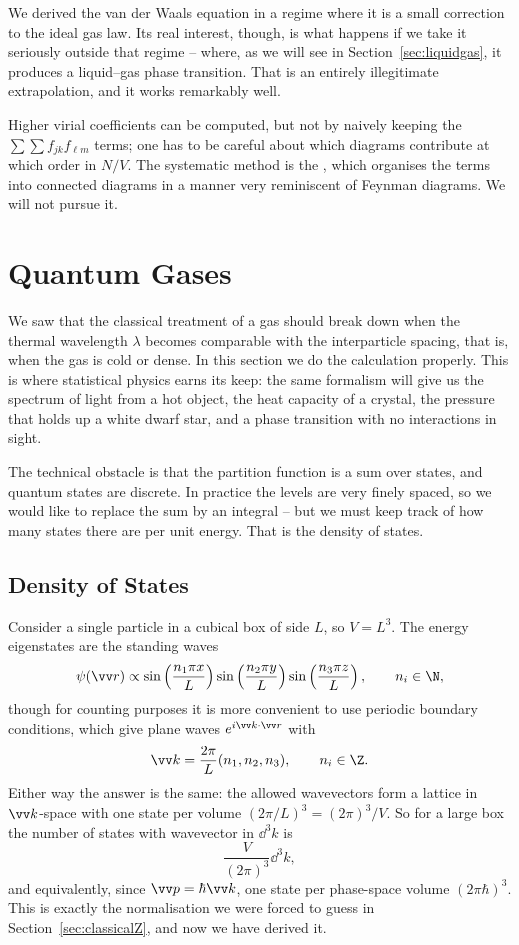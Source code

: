 We derived the van der Waals equation in a regime where it is a small correction to the ideal gas law. Its real interest, though, is what happens if we take it seriously outside that regime -- where, as we will see in Section~\ref{sec:liquidgas}, it produces a liquid--gas phase transition. That is an entirely illegitimate extrapolation, and it works remarkably well.

Higher virial coefficients can be computed, but not by naively keeping the $\sum\sum f_{jk}f_{\ell m}$ terms; one has to be careful about which diagrams contribute at which order in $N/V$. The systematic method is the , which organises the terms into connected diagrams in a manner very reminiscent of Feynman diagrams. We will not pursue it.

\section{Quantum Gases}\label{sec:quantumgases}

We saw that the classical treatment of a gas should break down when the thermal wavelength $\lambda$ becomes comparable with the interparticle spacing, that is, when the gas is cold or dense. In this section we do the calculation properly. This is where statistical physics earns its keep: the same formalism will give us the spectrum of light from a hot object, the heat capacity of a crystal, the pressure that holds up a white dwarf star, and a phase transition with no interactions in sight.

The technical obstacle is that the partition function is a sum over states, and quantum states are discrete. In practice the levels are very finely spaced, so we would like to replace the sum by an integral -- but we must keep track of how many states there are per unit energy. That is the density of states.

\subsection{Density of States}\label{sec:dos}

Consider a single particle in a cubical box of side $L$, so $V = L^3$. The energy eigenstates are the standing waves
$$
\psi(\vv r) \propto \sin\left(\frac{n_1 \pi x}{L}\right)\sin\left(\frac{n_2\pi y}{L}\right)\sin\left(\frac{n_3 \pi z}{L}\right), \qquad n_i \in \N,
$$
though for counting purposes it is more convenient to use periodic boundary conditions, which give plane waves $e^{i\vv k \cdot \vv r}$ with
$$
\vv k = \frac{2\pi}{L}(n_1, n_2, n_3), \qquad n_i \in \Z.
$$
Either way the answer is the same: the allowed wavevectors form a lattice in $\vv k$-space with one state per volume $(2\pi/L)^3 = (2\pi)^3/V$. So for a large box the number of states with wavevector in $\dd^3 k$ is
$$
\frac{V}{(2\pi)^3}\dd^3 k,
$$
and equivalently, since $\vv p = \hbar \vv k$, one state per phase-space volume $(2\pi\hbar)^3$. This is exactly the normalisation we were forced to guess in Section~\ref{sec:classicalZ}, and now we have derived it.

